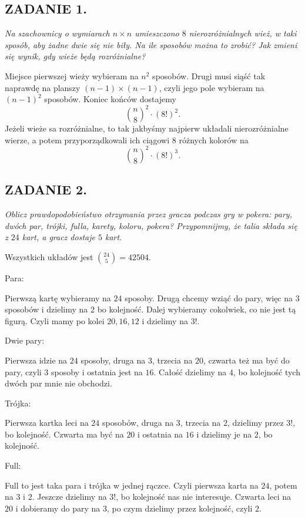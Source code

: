 \documentclass{article}
\begin{document}
\subsection*{ZADANIE 1.}
\emph{Na szachownicy o wymiarach $n\times n$ umieszczono $8$ nierozróżnialnych wież, w taki sposób, aby żadne dwie się nie biły. Na ile sposobów można to zrobić? Jak zmieni się wynik, gdy wieże będą rozróżnialne?}
\smallskip

Miejsce pierwszej wieży wybieram na $n^2$ sposobów. Drugi musi siąść tak naprawdę na planszy $(n-1)\times(n-1)$, czyli jego pole wybieram na $(n-1)^2$ sposobów. Koniec końców dostajemy
$${n\choose 8}^2\cdot (8!)^2.$$
Jeżeli wieże sa rozróżnialne, to tak jakbyśmy najpierw układali nierozróżnialne wierze, a potem przyporządkowali ich ciągowi $8$ różnych kolorów na
$${n\choose 8}^2\cdot(8!)^3.$$

\subsection*{ZADANIE 2.}
\emph{Oblicz prawdopodobieństwo otrzymania przez gracza podczas gry w pokera: pary, dwóch par, trójki, fulla, karety, koloru, pokera? Przypomnijmy, że talia składa się z $24$ kart, a gracz dostaje $5$ kart.}
\smallskip

Wszystkich układów jest ${24\choose 5}=42504$.

{\color{green}Para:}

Pierwszą kartę wybieramy na $24$ sposoby. Drugą chcemy wziąć do pary, więc na $3$ sposobów i dzielimy na $2$ bo kolejność. Dalej wybieramy cokolwiek, co nie jest tą figurą. Czyli mamy po kolei $20,16,12$ i dzielimy na $3!$.
\smallskip

{\color{green}Dwie pary:}

Pierwsza idzie na $24$ sposoby, druga na $3$, trzecia na $20$, czwarta też ma być do pary, czyli $3$ sposoby i ostatnia jest na $16$. Całość dzielimy na $4$, bo kolejność tych dwóch par mnie nie obchodzi.
\smallskip

{\color{green}Trójka:}

Pierwsza kartka leci na $24$ sposobów, druga na $3$, trzecia na $2$, dzielimy przez $3!$, bo kolejność. Czwarta ma być na $20$ i ostatnia na $16$ i dzielimy je na $2$, bo kolejność.
\smallskip

{\color{green}Full:}

Full to jest taka para i trójka w jednej rączce. Czyli pierwsza karta na $24$, potem na $3$ i $2$. Jeszcze dzielimy na $3!$, bo kolejność nas nie interesuje. Czwarta leci na $20$ i dobieramy do pary na $3$, po czym dzielimy przez kolejność, czyli $2$.
\smallskip
\end{document}
